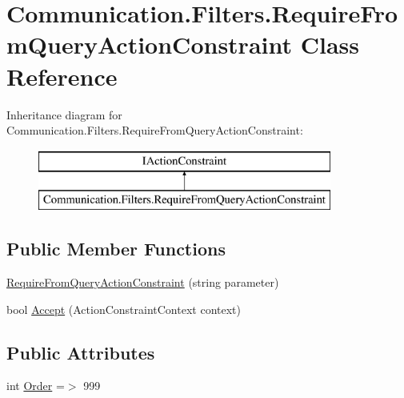 \hypertarget{class_communication_1_1_filters_1_1_require_from_query_action_constraint}{}\section{Communication.\+Filters.\+Require\+From\+Query\+Action\+Constraint Class Reference}
\label{class_communication_1_1_filters_1_1_require_from_query_action_constraint}
Inheritance diagram for Communication.\+Filters.\+Require\+From\+Query\+Action\+Constraint\+:\begin{figure}[H]
\begin{center}
\leavevmode
\includegraphics[height=2.000000cm]{class_communication_1_1_filters_1_1_require_from_query_action_constraint}
\end{center}
\end{figure}
\subsection*{Public Member Functions}
\begin{DoxyCompactItemize}
\item 
\mbox{\hyperlink{class_communication_1_1_filters_1_1_require_from_query_action_constraint_ac2fe17d4c55de254d83b1a896b5f3258}{Require\+From\+Query\+Action\+Constraint}} (string parameter)
\item 
bool \mbox{\hyperlink{class_communication_1_1_filters_1_1_require_from_query_action_constraint_a4d9bbad71f8e7c1708dde03e037e37db}{Accept}} (Action\+Constraint\+Context context)
\end{DoxyCompactItemize}
\subsection*{Public Attributes}
\begin{DoxyCompactItemize}
\item 
int \mbox{\hyperlink{class_communication_1_1_filters_1_1_require_from_query_action_constraint_aee1bc3b92237aade5ce159e2422df698}{Order}} =$>$ 999
\end{DoxyCompactItemize}


